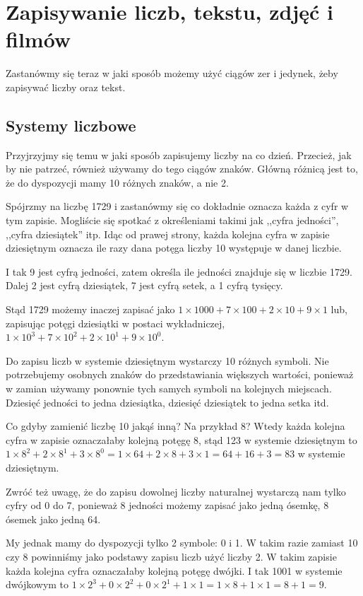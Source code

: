 \documentclass[11pt]{book}
\begin{document}
\section{Zapisywanie liczb, tekstu, zdjęć i filmów}
Zastanówmy się teraz w jaki sposób możemy użyć ciągów zer i jedynek, żeby
zapisywać liczby oraz tekst.

\subsection{Systemy liczbowe}
Przyjrzyjmy się temu w jaki sposób zapisujemy liczby na co dzień. Przecież,
jak by nie patrzeć, również używamy do tego ciągów znaków. Główną różnicą
jest to, że do dyspozycji mamy 10 różnych znaków, a nie 2.

Spójrzmy na liczbę 1729 i zastanówmy się co dokładnie oznacza każda z cyfr
w tym zapisie. Mogliście się spotkać z określeniami takimi jak
,,cyfra jedności'', ,,cyfra dziesiątek'' itp. Idąc od prawej strony, każda
kolejna cyfra w zapisie dziesiętnym oznacza ile razy dana potęga liczby 10
występuje w danej liczbie.

I tak 9 jest cyfrą jedności, zatem określa ile jedności znajduje się w liczbie
1729. Dalej 2 jest cyfrą dziesiątek, 7 jest cyfrą setek, a 1 cyfrą tysięcy.

Stąd 1729 możemy inaczej zapisać jako $1\times 1000 + 7\times 100 + 2\times 10
+ 9\times 1$ lub, zapisując potęgi dziesiątki w postaci wykładniczej,
$1\times 10^3 + 7\times 10^2 + 2\times 10^1 + 9\times 10^0$.

Do zapisu liczb w systemie dziesiętnym wystarczy 10 różnych symboli. Nie
potrzebujemy osobnych znaków do przedstawiania większych wartości, ponieważ
w zamian używamy ponownie tych samych symboli na kolejnych miejscach.
Dziesięć jedności to jedna dziesiątka, dziesięć dziesiątek to jedna setka itd.

Co gdyby zamienić liczbę 10 jakąś inną? Na przykład 8? Wtedy każda kolejna
cyfra w zapisie oznaczałaby kolejną potęgę 8, stąd 123 w systemie dziesiętnym
to $1 \times 8^2 + 2 \times 8^1 + 3 \times 8^0 = 1 \times 64 + 2 \times 8
+ 3 \times 1 = 64 + 16 + 3 = 83$ w systemie dziesiętnym.

Zwróć też uwagę, że do zapisu dowolnej liczby naturalnej wystarczą nam tylko
cyfry od 0 do 7, ponieważ 8 jedności możemy zapisać jako jedną ósemkę,
8 ósemek jako jedną 64.

My jednak mamy do dyspozycji tylko 2 symbole: 0 i 1. W takim razie zamiast
10 czy 8 powinniśmy jako podstawy zapisu liczb użyć liczby 2. W takim
zapisie każda kolejna cyfra oznaczałaby kolejną potęgę dwójki. I tak 1001
w systemie dwójkowym to $1\times 2^3 + 0\times 2^2 + 0\times 2^1 + 1\times 1
= 1 \times 8 + 1 \times 1 = 8+1 = 9$.
\end{document}
